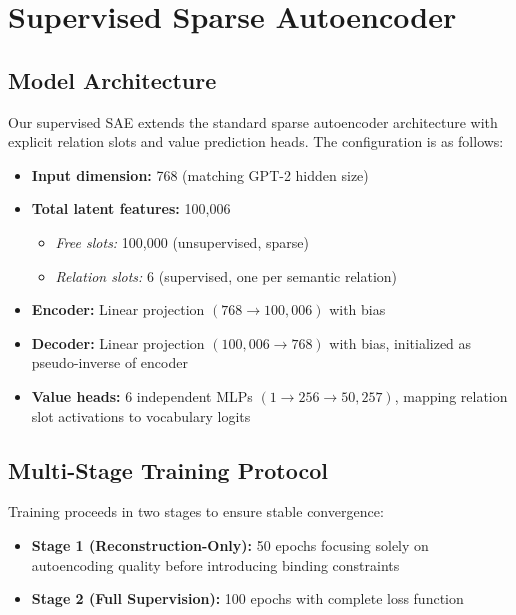 \section{Supervised Sparse Autoencoder}
\label{app:sae}

\subsection{Model Architecture}

Our supervised SAE extends the standard sparse autoencoder architecture with explicit relation slots and value prediction heads. The configuration is as follows:

\begin{itemize}[leftmargin=*,noitemsep]
    \item \textbf{Input dimension:} 768 (matching GPT-2 hidden size)
    \item \textbf{Total latent features:} 100,006
    \begin{itemize}
        \item \textit{Free slots:} 100,000 (unsupervised, sparse)
        \item \textit{Relation slots:} 6 (supervised, one per semantic relation)
    \end{itemize}
    \item \textbf{Encoder:} Linear projection $(768 \rightarrow 100{,}006)$ with bias
    \item \textbf{Decoder:} Linear projection $(100{,}006 \rightarrow 768)$ with bias, initialized as pseudo-inverse of encoder
    \item \textbf{Value heads:} 6 independent MLPs $(1 \rightarrow 256 \rightarrow 50{,}257)$, mapping relation slot activations to vocabulary logits
\end{itemize}

\subsection{Multi-Stage Training Protocol}

Training proceeds in two stages to ensure stable convergence:

\begin{itemize}[leftmargin=*,noitemsep]
    \item \textbf{Stage 1 (Reconstruction-Only):} 50 epochs focusing solely on autoencoding quality before introducing binding constraints
    \item \textbf{Stage 2 (Full Supervision):} 100 epochs with complete loss function
\end{itemize}

